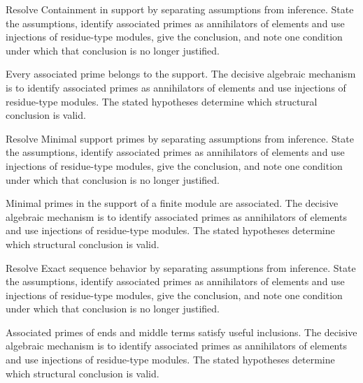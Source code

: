 \begin{problem}\label{prob:v17-problem-04}
Resolve Containment in support by separating assumptions from inference. State the assumptions, identify associated primes as annihilators of elements and use injections of residue-type modules, give the conclusion, and note one condition under which that conclusion is no longer justified.
\end{problem}
\begin{solution}
Every associated prime belongs to the support. The decisive algebraic mechanism is to identify associated primes as annihilators of elements and use injections of residue-type modules. The stated hypotheses determine which structural conclusion is valid.
\end{solution}

\begin{problem}\label{prob:v17-problem-05}
Resolve Minimal support primes by separating assumptions from inference. State the assumptions, identify associated primes as annihilators of elements and use injections of residue-type modules, give the conclusion, and note one condition under which that conclusion is no longer justified.
\end{problem}
\begin{solution}
Minimal primes in the support of a finite module are associated. The decisive algebraic mechanism is to identify associated primes as annihilators of elements and use injections of residue-type modules. The stated hypotheses determine which structural conclusion is valid.
\end{solution}

\begin{problem}\label{prob:v17-problem-06}
Resolve Exact sequence behavior by separating assumptions from inference. State the assumptions, identify associated primes as annihilators of elements and use injections of residue-type modules, give the conclusion, and note one condition under which that conclusion is no longer justified.
\end{problem}
\begin{solution}
Associated primes of ends and middle terms satisfy useful inclusions. The decisive algebraic mechanism is to identify associated primes as annihilators of elements and use injections of residue-type modules. The stated hypotheses determine which structural conclusion is valid.
\end{solution}

